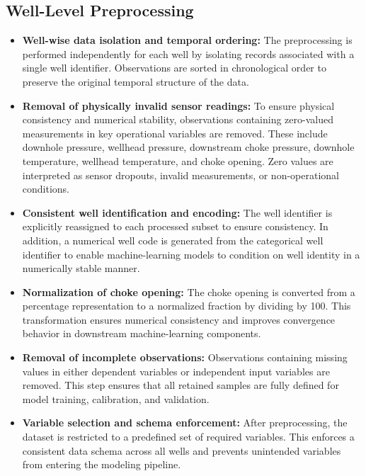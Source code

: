 \documentclass[12pt,APA]{uomthesis}
\begin{document}
\subsection{Well-Level Preprocessing}
\begin{itemize}
    \item \textbf{Well-wise data isolation and temporal ordering:}  
    The preprocessing is performed independently for each well by isolating records associated with a single well identifier. Observations are sorted in chronological order to preserve the original temporal structure of the data.

    \item \textbf{Removal of physically invalid sensor readings:}  
    To ensure physical consistency and numerical stability, observations containing zero-valued measurements in key operational variables are removed. These include downhole pressure, wellhead pressure, downstream choke pressure, downhole temperature, wellhead temperature, and choke opening. Zero values are interpreted as sensor dropouts, invalid measurements, or non-operational conditions.

    \item \textbf{Consistent well identification and encoding:}  
    The well identifier is explicitly reassigned to each processed subset to ensure consistency. In addition, a numerical well code is generated from the categorical well identifier to enable machine-learning models to condition on well identity in a numerically stable manner.

    \item \textbf{Normalization of choke opening:}  
    The choke opening is converted from a percentage representation to a normalized fraction by dividing by 100. This transformation ensures numerical consistency and improves convergence behavior in downstream machine-learning components.

    \item \textbf{Removal of incomplete observations:}  
    Observations containing missing values in either dependent variables or independent input variables are removed. This step ensures that all retained samples are fully defined for model training, calibration, and validation.

    \item \textbf{Variable selection and schema enforcement:}  
    After preprocessing, the dataset is restricted to a predefined set of required variables. This enforces a consistent data schema across all wells and prevents unintended variables from entering the modeling pipeline.


\end{itemize}
\end{document}

